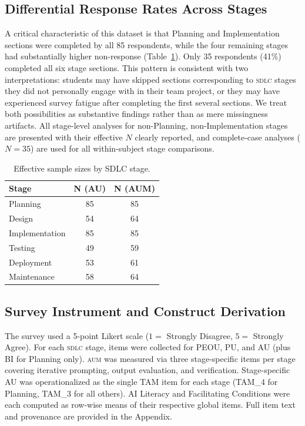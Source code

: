\documentclass[sigconf,anonymous]{acmart}
\newcommand{\AUM}{\textsc{aum}\xspace}
\newcommand{\SDLC}{\textsc{sdlc}\xspace}
\begin{document}
\subsection{Differential Response Rates Across Stages}
A critical characteristic of this dataset is that Planning and
Implementation sections were completed by all 85 respondents, while the
four remaining stages had substantially higher non-response
(Table~\ref{tab:ns}). Only 35 respondents (41\%) completed all six stage
sections. This pattern is consistent with two interpretations: students
may have skipped sections corresponding to \SDLC stages they did not
personally engage with in their team project, or they may have
experienced survey fatigue after completing the first several sections.
We treat both possibilities as substantive findings rather than as mere
missingness artifacts. All stage-level analyses for non-Planning,
non-Implementation stages are presented with their effective $N$ clearly
reported, and complete-case analyses ($N = 35$) are used for all
within-subject stage comparisons.

\begin{table}[h]
\small
\caption{Effective sample sizes by SDLC stage.}
\label{tab:ns}
\begin{tabular}{lcc}
\toprule
\textbf{Stage} & \textbf{N (AU)} & \textbf{N (AUM)} \\
\midrule
Planning       & 85 & 85 \\
Design         & 54 & 64 \\
Implementation & 85 & 85 \\
Testing        & 49 & 59 \\
Deployment     & 53 & 61 \\
Maintenance    & 58 & 64 \\
\bottomrule
\end{tabular}
\end{table}

\subsection{Survey Instrument and Construct Derivation}
The survey used a 5-point Likert scale ($1 = $ Strongly Disagree,
$5 = $ Strongly Agree). For each \SDLC stage, items were collected for
PEOU, PU, and AU (plus BI for Planning only). \AUM was measured via
three stage-specific items per stage covering iterative prompting, output
evaluation, and verification. Stage-specific AU was operationalized as
the single TAM item for each stage (TAM\_4 for Planning, TAM\_3 for all
others). AI Literacy and Facilitating Conditions were each computed as
row-wise means of their respective global items. Full item text and
provenance are provided in the Appendix.
\end{document}
